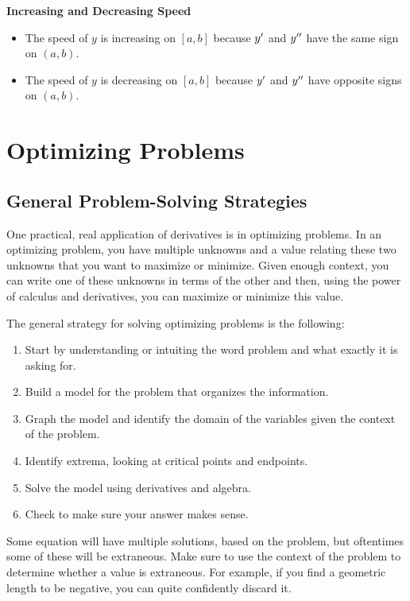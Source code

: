 \textbf{Increasing and Decreasing Speed}

\begin{itemize}
    \item The speed of \( y \) is increasing on \( \left[ a, b \right] \) because \( y^\prime \) and \( y^{\prime\prime} \) have the same sign on \( \left( a, b \right) \).
    \item The speed of \( y \) is decreasing on \( \left[ a, b \right] \) because \( y^\prime \) and \( y^{\prime\prime} \) have opposite signs on \( \left( a, b \right) \).
\end{itemize}

\section{Optimizing Problems}

\subsection{General Problem-Solving Strategies}

One practical, real application of derivatives is in optimizing problems. In an optimizing problem, you have multiple unknowns and a value relating these two unknowns that you want to maximize or minimize. Given enough context, you can write one of these unknowns in terms of the other and then, using the power of calculus and derivatives, you can maximize or minimize this value.

The general strategy for solving optimizing problems is the following:

\begin{enumerate}
    \item Start by understanding or intuiting the word problem and what exactly it is asking for.
    \item Build a model for the problem that organizes the information.
    \item Graph the model and identify the domain of the variables given the context of the problem.
    \item Identify extrema, looking at critical points and endpoints.
    \item Solve the model using derivatives and algebra.
    \item Check to make sure your answer makes sense.
\end{enumerate}

Some equation will have multiple solutions, based on the problem, but oftentimes some of these will be extraneous. Make sure to use the context of the problem to determine whether a value is extraneous. For example, if you find a geometric length to be negative, you can quite confidently discard it.


